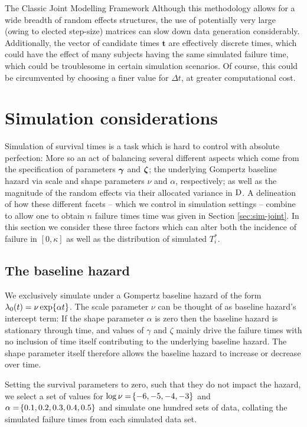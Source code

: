 \begin{chapter}{\label{cha:methods-classic}The Classic Joint Modelling Framework}
  Although this methodology allows for a wide breadth of random effects structures, the use of potentially very large (owing to elected step-size) matrices can slow down data generation considerably. Additionally, the vector of candidate times $\bm{t}$ are effectively discrete times, which could have the effect of many subjects having the same simulated failure time, which could be troublesome in certain simulation scenarios. Of course, this could be circumvented by choosing a finer value for $\Delta t$, at greater computational cost.
  
  \section{\label{sec:sim-considerations}Simulation considerations}
  Simulation of survival times is a task which is hard to control with absolute perfection: More so an act of balancing several different aspects which come from the specification of parameters $\bm{\gamma}$ and $\bm{\zeta}$; the underlying Gompertz baseline hazard via scale and shape parameters $\nu$ and $\alpha$, respectively; as well as the magnitude of the random effects via their allocated variance in $\mathrm{D}$. A delineation of how these different facets -- which we control in simulation settings -- combine to allow one to obtain $n$ failure times time was given in Section \ref{sec:sim-joint}. In this section we consider these three factors which can alter both the incidence of failure in $[0,\kappa]$ as well as the distribution of simulated $T_i^*$.
  
  \subsection{The baseline hazard}\label{sec:sim-considerations-basehaz}
  We exclusively simulate under a Gompertz baseline hazard of the form $\lambda_0(t)=\nu\exp\!\left\{\alpha t\right\}$. The scale parameter $\nu$ can be thought of as baseline hazard's intercept term: If the shape parameter $\alpha$ is zero then the baseline hazard is stationary through time, and values of $\gamma$ and $\zeta$ mainly drive the failure times with no inclusion of time itself contributing to the underlying baseline hazard. The shape parameter itself therefore allows the baseline hazard to increase or decrease over time.
  
  Setting the survival parameters to zero, such that they do not impact the hazard, we select a set of values for $\log\nu=\!\left\{-6,-5,-4,-3\right\}$ and $\alpha=\!\left\{0.1,0.2,0.3,0.4,0.5\right\}$ and simulate one hundred sets of data, collating the simulated failure times from each simulated data set. 
  

\end{chapter}
